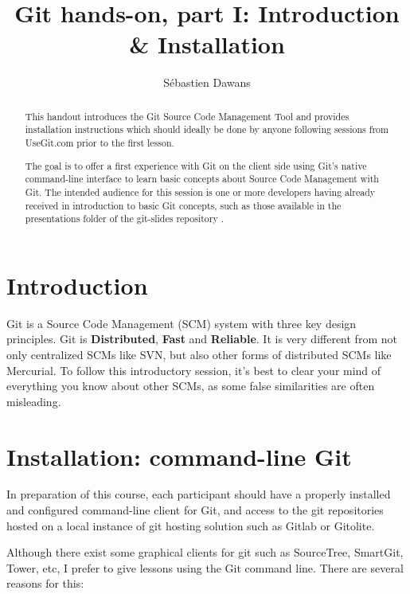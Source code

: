 \documentclass{../../common/tufte-latex/tufte-handout}
\title{Git hands-on, part I: Introduction \& Installation}
\author{S\'ebastien Dawans}
\begin{document}
\maketitle%

\begin{abstract}
\noindent
This handout introduces the Git Source Code Management Tool and provides installation instructions which should ideally be done by anyone following sessions from UseGit.com  prior to the first lesson.

The goal is to offer a first experience with Git on the client side using Git's native command-line interface to learn basic concepts about Source Code Management with Git.
The intended audience for this session is one or more developers having already received in introduction to basic Git concepts, such as those available in the presentations folder of the git-slides repository .

\end{abstract}


\section{Introduction}\label{sec:intro}

Git is a Source Code Management (SCM) system with three key design principles.
Git is \textbf{Distributed}, \textbf{Fast} and \textbf{Reliable}.
It is very different from not only centralized SCMs like SVN, but also other forms of distributed SCMs like Mercurial.
To follow this introductory session, it's best to clear your mind of everything you know about other SCMs, as some false similarities are often misleading.

\section{Installation: command-line Git}

In preparation of this course, each participant should have a properly installed and configured command-line client for Git, and access to the git repositories hosted on a local instance of git hosting solution such as Gitlab or Gitolite.

Although there exist some graphical clients for git such as SourceTree, SmartGit, Tower, etc, I prefer to give lessons using the Git command line. There are several reasons for this:
\end{document}
